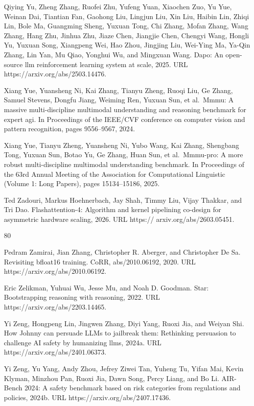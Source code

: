 \documentclass[
  10
]{article}
\begin{document}
Qiying Yu, Zheng Zhang, Ruofei Zhu, Yufeng Yuan, Xiaochen Zuo, Yu Yue,
Weinan Dai, Tiantian Fan, Gaohong Liu, Lingjun Liu, Xin Liu, Haibin Lin,
Zhiqi Lin, Bole Ma, Guangming Sheng, Yuxuan Tong, Chi Zhang, Mofan
Zhang, Wang Zhang, Hang Zhu, Jinhua Zhu, Jiaze Chen, Jiangjie Chen,
Chengyi Wang, Hongli Yu, Yuxuan Song, Xiangpeng Wei, Hao Zhou, Jingjing
Liu, Wei-Ying Ma, Ya-Qin Zhang, Lin Yan, Mu Qiao, Yonghui Wu, and
Mingxuan Wang. Dapo: An open-source llm reinforcement learning system at
scale, 2025. URL https://arxiv.org/abs/2503.14476.

Xiang Yue, Yuansheng Ni, Kai Zhang, Tianyu Zheng, Ruoqi Liu, Ge Zhang,
Samuel Stevens, Dongfu Jiang, Weiming Ren, Yuxuan Sun, et al.~Mmmu: A
massive multi-discipline multimodal understanding and reasoning
benchmark for expert agi. In Proceedings of the IEEE/CVF conference on
computer vision and pattern recognition, pages 9556--9567, 2024.

Xiang Yue, Tianyu Zheng, Yuansheng Ni, Yubo Wang, Kai Zhang, Shengbang
Tong, Yuxuan Sun, Botao Yu, Ge Zhang, Huan Sun, et al.~Mmmu-pro: A more
robust multi-discipline multimodal understanding benchmark. In
Proceedings of the 63rd Annual Meeting of the Association for
Computational Linguistic (Volume 1: Long Papers), pages 15134--15186,
2025.

Ted Zadouri, Markus Hoehnerbach, Jay Shah, Timmy Liu, Vijay Thakkar, and
Tri Dao. Flashattention-4: Algorithm and kernel pipelining co-design for
asymmetric hardware scaling, 2026. URL https://
arxiv.org/abs/2603.05451.

80

Pedram Zamirai, Jian Zhang, Christopher R. Aberger, and Christopher De
Sa. Revisiting bfloat16 training. CoRR, abs/2010.06192, 2020. URL
https://arxiv.org/abs/2010.06192.

Eric Zelikman, Yuhuai Wu, Jesse Mu, and Noah D. Goodman. Star:
Bootstrapping reasoning with reasoning, 2022. URL
https://arxiv.org/abs/2203.14465.

Yi Zeng, Hongpeng Lin, Jingwen Zhang, Diyi Yang, Ruoxi Jia, and Weiyan
Shi. How Johnny can persuade LLMs to jailbreak them: Rethinking
persuasion to challenge AI safety by humanizing llms, 2024a. URL
https://arxiv.org/abs/2401.06373.

Yi Zeng, Yu Yang, Andy Zhou, Jefrey Ziwei Tan, Yuheng Tu, Yifan Mai,
Kevin Klyman, Minzhou Pan, Ruoxi Jia, Dawn Song, Percy Liang, and Bo Li.
AIR-Bench 2024: A safety benchmark based on risk categories from
regulations and policies, 2024b. URL https://arxiv.org/abs/2407.17436.
\end{document}
